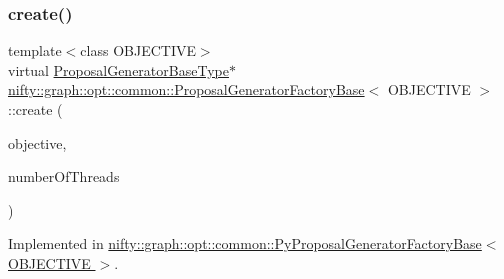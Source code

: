 \subsubsection{\texorpdfstring{create()}{create()}}
{\footnotesize\ttfamily template$<$class O\+B\+J\+E\+C\+T\+I\+VE$>$ \\
virtual \hyperlink{classnifty_1_1graph_1_1opt_1_1common_1_1ProposalGeneratorFactoryBase_a262cfc7056a43871e15130dd4435dee7}{Proposal\+Generator\+Base\+Type}$\ast$ \hyperlink{classnifty_1_1graph_1_1opt_1_1common_1_1ProposalGeneratorFactoryBase}{nifty\+::graph\+::opt\+::common\+::\+Proposal\+Generator\+Factory\+Base}$<$ O\+B\+J\+E\+C\+T\+I\+VE $>$\+::create (\begin{DoxyParamCaption}\item[{const \hyperlink{classnifty_1_1graph_1_1opt_1_1common_1_1ProposalGeneratorFactoryBase_abb308b47da6f89126f786b394be0efc5}{Objective\+Type} \&}]{objective,  }\item[{const size\+\_\+t}]{number\+Of\+Threads }\end{DoxyParamCaption})\hspace{0.3cm}{\ttfamily [pure virtual]}}



Implemented in \hyperlink{classnifty_1_1graph_1_1opt_1_1common_1_1PyProposalGeneratorFactoryBase_a15f89029ba9b9b3afe398551667ada0d}{nifty\+::graph\+::opt\+::common\+::\+Py\+Proposal\+Generator\+Factory\+Base$<$ O\+B\+J\+E\+C\+T\+I\+V\+E $>$}.

\mbox{\label{classnifty_1_1graph_1_1opt_1_1common_1_1ProposalGeneratorFactoryBase_a0c4cfed6cb2b4ac7244d1a076a0ec3b7}} 
